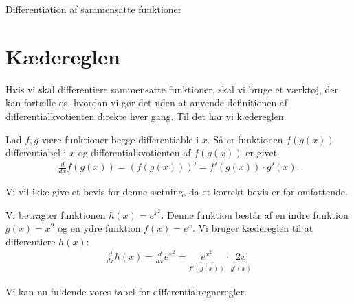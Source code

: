 \begin{center}
\Huge
Differentiation af sammensatte funktioner
\end{center}
\section*{Kædereglen}

Hvis vi skal differentiere sammensatte funktioner, skal vi bruge et værktøj, der kan fortælle os, hvordan vi gør det uden at anvende definitionen af differentialkvotienten direkte hver gang. Til det har vi kædereglen.
\begin{setn}[Kædereglen]
Lad $f,g$ være funktioner begge differentiable i $x$. Så er funktionen $f(g(x))$ differentiabel i $x$ og 
differentialkvotienten af $f(g(x))$ er givet
\begin{align*}
\frac{d}{dx}f(g(x)) = (f(g(x)))' = f'(g(x))\cdot g'(x).
\end{align*}
\end{setn}
Vi vil ikke give et bevis for denne sætning, da et korrekt bevis er for omfattende. 
\begin{exa}
Vi betragter funktionen $h(x) = e^{x^2}$. Denne funktion består af en indre funktion $g(x)=x^2$ og en ydre funktion $f(x)=e^x$. Vi bruger kædereglen til at differentiere $h(x)$:
\begin{align*}
\frac{d}{d x} h(x) = \frac{d}{dx}e^{x^2} = \underbrace{e^{x^2}}_{f'(g(x))}\cdot \underbrace{2x}_{g'(x)}
\end{align*}
\end{exa}
Vi kan nu fuldende vores tabel for differentialregneregler.
